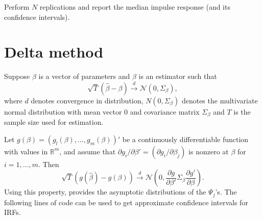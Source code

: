 \documentclass[
  12pt,
]{book}
\theoremstyle{definition}
\theoremstyle{definition}
\theoremstyle{definition}
\theoremstyle{definition}
\theoremstyle{remark}
\begin{document}
Perform \(N\) replications and report the median impulse response (and its confidence intervals).

\hypertarget{delta-method}{%
\section{Delta method}\label{delta-method}}

Suppose \(\beta\) is a vector of parameters and \(\beta\) is an estimator such that
\[
\sqrt{T}(\hat\beta-\beta)\overset{d}{\rightarrow}\mathcal{N}(0,\Sigma_\beta),
\]
where \(d\) denotes convergence in distribution, \(N(0,\Sigma_\beta)\) denotes the multivariate normal distribution with mean vector 0 and covariance matrix \(\Sigma_\beta\) and \(T\) is the sample size used for estimation.

Let \(g(\beta) = (g_l(\beta),..., g_m(\beta))'\) be a continuously differentiable function with values in \(\mathbb{R}^m\), and assume that \(\partial g_i/\partial \beta' = (\partial g_i/\partial \beta_j)\) is nonzero at \(\beta\) for \(i = 1,\dots, m\). Then
\[
\sqrt{T}(g(\hat\beta)-g(\beta))\overset{d}{\rightarrow}\mathcal{N}\left(0,\frac{\partial g}{\partial \beta'}\Sigma_\beta\frac{\partial g'}{\partial \beta}\right).
\]
Using this property, \citet{Lutkepohl_1990} provides the asymptotic distributions of the \(\Psi_j\)'s. The following lines of code can be used to get approximate confidence intervals for IRFs.
\end{document}
